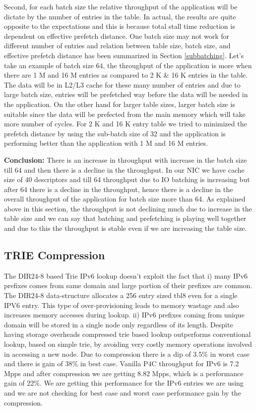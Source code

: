 Second, for each batch size the relative throughput of the application will be dictate by the number of entries in the table. In actual, the results are quite opposite to the expectations and this is because total stall time reduction is dependent on effective prefetch distance. One batch size may not work for different number of entries and relation between table size, batch size, and effective prefetch distance has been summarized in Section \ref{subbatching}. Let's take an example of batch size 64, the throughput of the application is more when there are 1 M and 16 M entries as compared to 2 K \& 16 K entries in the table. The data will be in L2/L3 cache for these many number of entries and due to large batch size, entries will be prefetched way before the data will be needed in the application. On the other hand for larger table sizes, larger batch size is suitable since the data will be prefected from the main memory which will take more number of cycles. For 2 K and 16 K entry table we tried to minimized the prefetch distance by using the sub-batch size of 32 and the application is performing better than the application with 1 M and 16 M entries.

\textbf{Conclusion:} 
There is an increase in throughput with increase in the batch size till 64 and then there is a decline in the throughput. In our NIC we have cache size of 40 descriptors and till 64 throughput due to IO batching is increasing but after 64 there is a decline in the throughput, hence there is a decline in the overall throughput of the application for batch size more than 64. As explained above in this section, the throughput is not declining much due to increase in the table size and we can say that batching and prefetching is playing well together and due to this the throughput is stable even if we are increasing the table size.

\subsection{TRIE Compression}
The DIR24-8\cite{Gupta98routinglookups} based Trie IPv6 lookup doesn't exploit the fact that i) many IPv6 prefixes comes from same domain and large portion of their prefixes are common. The DIR24-8 data-structure allocates a 256 entry sized tbl8 even for a single IPV6 entry. This type of over-provisioning leads to memory wastage and also increases memory accesses during lookup. ii) IPv6 prefixes coming from unique domain will be stored in a single node only regardless of its length. Despite having storage overheads compressed trie based lookup outperforms conventional lookup, based on simple trie, by avoiding very costly memory operations involved in accessing a new node. Due to compression there is a dip of 3.5\% in worst case and there is gain of 38\% in best case. Vanilla P4C throughput for IPv6 is 7.2 Mpps and after compression we are getting 8.82 Mpps, which is a performance gain of 22\%. We are getting this performance for the IPv6 entries we are using and we are not checking for best case and worst case performance gain by the compression.

